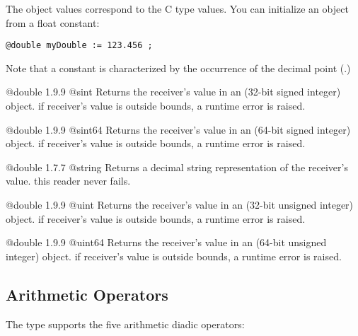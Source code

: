 

The  object values correspond to the C type  values. You can initialize an  object from a float constant:

\texttt{@double myDouble := 123.456 ;}

Note that a  constant is characterized by the occurrence of the decimal point (.)


{@double}
{1.9.9}
{@sint}
{Returns the receiver's value in an  (32-bit signed integer) object.}
{if receiver's value is outside  bounds, a runtime error is raised.}



{@double}
{1.9.9}
{@sint64}
{Returns the receiver's value in an  (64-bit signed integer) object.}
{if receiver's value is outside  bounds, a runtime error is raised.}




{@double}
{1.7.7}
{@string}
{Returns a decimal string representation of the receiver's value.}
{this reader never fails.}







{@double}
{1.9.9}
{@uint}
{Returns the receiver's value in an  (32-bit unsigned integer) object.}
{if receiver's value is outside  bounds, a runtime error is raised.}





{@double}
{1.9.9}
{@uint64}
{Returns the receiver's value in an  (64-bit unsigned integer) object.}
{if receiver's value is outside  bounds, a runtime error is raised.}




\subsection{Arithmetic Operators}

The  type supports the five arithmetic diadic operators:\newline

